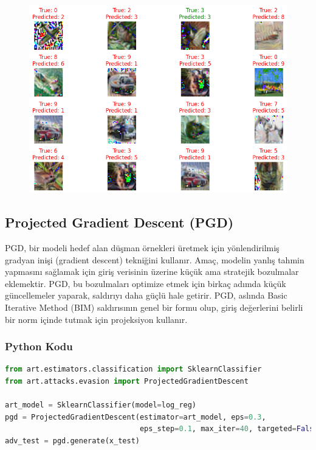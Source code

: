 \begin{figure}[h]
    \centering
    \includegraphics[width=1\textwidth]{images/basic_iterative_method_results.png}
    \caption{}
\end{figure}

\newpage

\subsection{Projected Gradient Descent (PGD)}

PGD, bir modeli hedef alan düşman örnekleri üretmek için yönlendirilmiş gradyan inişi (gradient descent) tekniğini kullanır. Amaç, modelin yanlış tahmin yapmasını sağlamak için giriş verisinin üzerine küçük ama stratejik bozulmalar eklemektir. PGD, bu bozulmaları optimize etmek için birkaç adımda küçük güncellemeler yaparak, saldırıyı daha güçlü hale getirir. PGD, aslında Basic Iterative Method (BIM) saldırısının genel bir formu olup, giriş değerlerini belirli bir norm içinde tutmak için projeksiyon kullanır.

\subsubsection{Python Kodu}

\begin{lstlisting}[language=Python]
from art.estimators.classification import SklearnClassifier
from art.attacks.evasion import ProjectedGradientDescent

art_model = SklearnClassifier(model=log_reg)
pgd = ProjectedGradientDescent(estimator=art_model, eps=0.3, 
                               eps_step=0.1, max_iter=40, targeted=False)
adv_test = pgd.generate(x_test)
\end{lstlisting}

